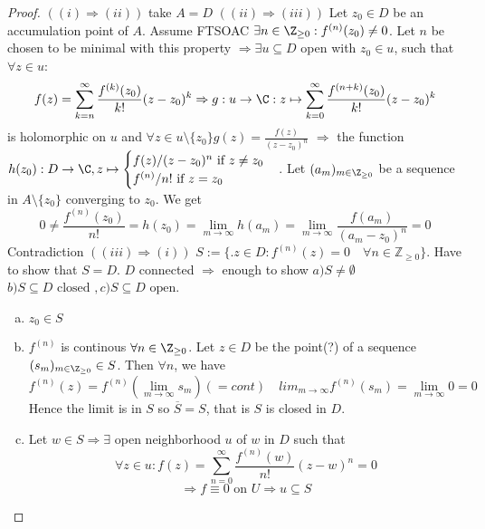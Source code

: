 \begin{proof}
  $((i)\Rightarrow (ii))$ take $A=D$
  \newline $((ii)\Rightarrow (iii))$ Let $z_0 \in D$ be an accumulation point of $A$. Assume FTSOAC $\exists n \in \Z_{\geq 0}: f^{(n)}(z_0)\neq 0$. Let $n$ be chosen to be minimal with this property
    $\Rightarrow \exists u \subseteq D$ open with $z_0\in u$, such that $\forall z\in u$:
      $$f(z)=\sum_{k=n}^{\infty}\frac{f^{(k)}(z_0)}{k!}(z-z_0)^k \Rightarrow g: u \to \C: z\mapsto \sum_{k=0}^{\infty}\frac{f^{(n+k)}(z_0)}{k!}(z-z_0)^k$$
      is holomorphic on $u$ and $\forall z\in u \setminus\{z_0\} g(z)=\frac{f(z)}{(z-z_0)^n}$
      \newline $\Rightarrow $ the function $h(z_0): D\to \C, z\mapsto
        \begin{cases}
          f(z)/(z-z_0)^n \text{ if }z\neq z_0 \\
          f^{(n)}/n! \text{ if }z=z_0
        \end{cases}
      $.
      \newline Let $(a_m)_{m\in \Z_{\geq 0}}$ be a sequence in $A\setminus \{z_0\}$ converging to $z_0$. We get
        $$0 \neq \frac{f^{(n)}(z_0)}{n!}=h(z_0)=\lim_{m\to \infty}h(a_m)= \lim_{m\to \infty}\frac{f(a_m)}{(a_m-z_0)^n}=0$$
        Contradiction
      \newline $((iii) \Rightarrow (i))$ $S:= \{.z \in D: f^{(n)}(z)=0 \quad \forall n \in \mathbb{Z}_{\geq 0}\}$. Have to show that $S=D$. $D$ connected $\Rightarrow $ enough to show $a) S\neq \emptyset$ $b) S\subseteq D \text{ closed }, c) S\subseteq D \text{ open}$.
        \begin{enumerate}[a)]
          \item $z_0 \in S$
          \item $f^{(n)}$ is continous $\forall n \in \Z_{\geq 0}$. Let $z\in D$ be the point(?) of a sequence $(s_m)_{m\in \Z_{\geq 0}}\in S$. Then $\forall n$, we have
            $$f^{(n)}(z)= f^{(n)}\left(\lim_{m\to \infty}s_m\right) (=cont) \quad lim_{m\to \infty}f^{(n)}(s_m)=\lim_{m\to \infty}0=0$$
            Hence the limit is in $S$ so $\overline{S}=S$, that is $S$ is closed in $D$.
          \item Let $w \in S \Rightarrow \exists$ open neighborhood $u$ of $w$ in $D$ such that
          $$\forall z\in u:f(z)=\sum_{n=0}^{\infty}\frac{f^{(n)}(w)}{n!}(z-w)^n=0$$
          $$\Rightarrow f \equiv 0 \text{ on } U \Rightarrow u \subseteq S$$
          \qedhere
        \end{enumerate}
\end{proof}

